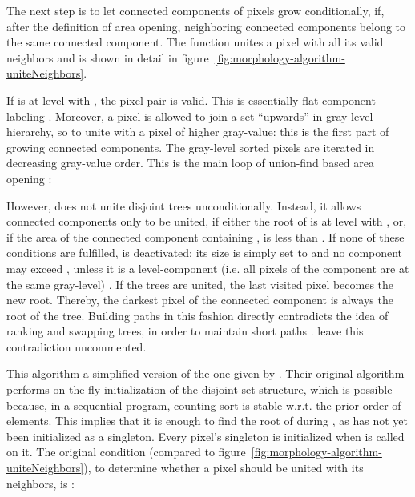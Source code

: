 The next step is to let connected components of pixels grow conditionally, if,
after the definition of area opening, neighboring connected components belong to
the same connected component. The function 
unites a pixel with all its valid neighbors and is shown in detail in
figure~\ref{fig:morphology-algorithm-uniteNeighbors}.

If  is at level with , the pixel pair is valid. This
is essentially flat component labeling \cite{Meijster2002Comparison}. Moreover,
a pixel is allowed to join a set ``upwards'' in gray-level hierarchy, so to
unite with a pixel of higher gray-value: this is the first part of growing
connected components. The gray-level sorted pixels are iterated in decreasing
gray-value order. This is the main loop of union-find based area opening
\cite{Meijster2002Comparison}:



However,  does not unite disjoint trees
unconditionally. Instead, it allows connected components only to be united, if
either the root of  is at level with , or, if the
area of the connected component containing , is less than
. If none of these conditions are fulfilled, 
is deactivated: its size is simply set to  and no component
may exceed , unless it is a level-component (i.e. all pixels
of the component are at the same gray-level) \cite{Meijster2002Comparison}. If
the trees are united, the last visited pixel  becomes the new
root. Thereby, the darkest pixel of the connected component is always the root
of the tree. Building paths in this fashion directly contradicts the idea of
ranking and swapping trees, in order to maintain short paths
\cite{Tarjan1983Data}. \citet{Meijster2002Comparison} leave this contradiction
uncommented.

This algorithm a simplified version of the one given by
\citet{Meijster2002Comparison}. Their original algorithm performs on-the-fly
initialization of the disjoint set structure, which is possible because, in a
sequential program, counting sort is stable w.r.t. the prior order of
elements. This implies that it is enough to find the root of 
during , as  has not yet been initialized as a
singleton. Every pixel's singleton is initialized when
 is called on it. The original condition (compared to
figure~\ref{fig:morphology-algorithm-uniteNeighbors}), to determine whether a
pixel should be united with its neighbors, is \cite{Meijster2002Comparison}:

